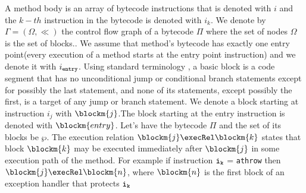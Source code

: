  A method body is an array of bytecode instructions that is denoted with $i$ and the $k-th$ instruction
 in the bytecode is  denoted with $i_{k}$.
 We denote by $\Gamma  = ( \Omega, \ll)$ the control flow graph of a
bytecode $\Pi$ where the set of nodes $\Omega$ is the set of
blocks.. We assume that method's bytecode has exactly one entry point(every execution of a method starts at the entry point instruction) and we denote it with $i_{\tt{entry}}$.  Using standard terminology \cite{ARUCom1986}, a
basic block is a code segment that has no unconditional jump or
conditional branch statements except for possibly the last
statement, and none of its statements, except possibly the first,
is a target of any jump or branch statement. 
 We denote a block starting at instruction  $i_{j}$ with $\blockm{j}$.The block starting at the entry instruction is denoted with $\blockm{entry}$. Let's have 
the bytecode $\Pi$ and the set of its blocks be $\wp$. The execution relation  $\blockm{j} \execRel \blockm{k}$  states that block
$ \blockm{k}$ may be executed immediately after $\blockm{j}$ in some execution path of the method. For example  if  instruction $\tt{i_{k}}$ = \texttt{athrow} then 
$\blockm{j} \execRel \blockm{n}$, where  $\blockm{n}$ is the first block of an exception handler that protects $\tt{i_{k}}$ 

